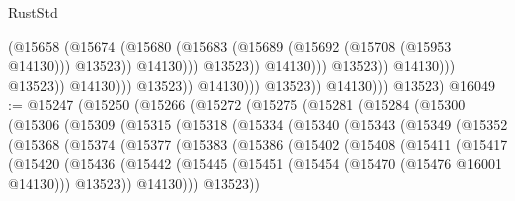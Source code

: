 \begin{lexlean}{RustStd}
\begin{coremodule}
                                                        (@15658
                                                          (@15674
                                                            (@15680
                                                              (@15683
                                                                (@15689
                                                                  (@15692 (@15708 (@15953 @14130)))
                                                                  @13523))
                                                              @14130)))
                                                        @13523))
                                                    @14130)))
                                              @13523))
                                          @14130)))
                                    @13523))
                                @14130)))
                          @13523))
                      @14130)))
                @13523))
            @14130)))
      @13523)
@16049 := @15247
    (@15250
      (@15266
        (@15272
          (@15275
            (@15281
              (@15284
                (@15300
                  (@15306
                    (@15309
                      (@15315
                        (@15318
                          (@15334
                            (@15340
                              (@15343
                                (@15349
                                  (@15352
                                    (@15368
                                      (@15374
                                        (@15377
                                          (@15383
                                            (@15386
                                              (@15402
                                                (@15408
                                                  (@15411
                                                    (@15417
                                                      (@15420
                                                        (@15436
                                                          (@15442
                                                            (@15445
                                                              (@15451
                                                                (@15454
                                                                  (@15470 (@15476 @16001 @14130)))
                                                                @13523))
                                                            @14130)))
                                                      @13523))

\end{coremodule}
\end{lexlean}
